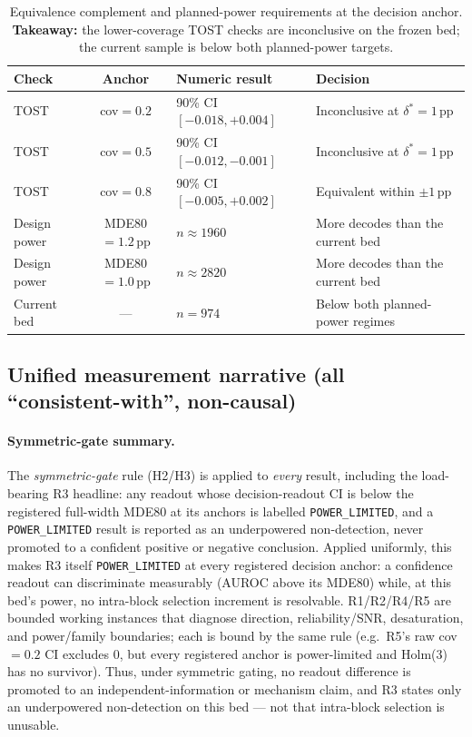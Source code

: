 \documentclass{article}
\begin{document}
\begin{table}[!htbp]
  \caption{Equivalence complement and planned-power requirements at the decision anchor.
  \textbf{Takeaway:} the lower-coverage TOST checks are inconclusive on the frozen bed;
  the current sample is below both planned-power targets.}
  \label{tab:powerplan}
  \centering
  \small
  \begin{tabularx}{\textwidth}{@{}lcl>{\raggedright\arraybackslash}X@{}}
    \toprule
    Check & Anchor & Numeric result & Decision \tabularnewline
    \midrule
    TOST & cov$=0.2$ & 90\% CI $[-0.018,+0.004]$ & Inconclusive at $\delta^*{=}1$\,pp \tabularnewline
    TOST & cov$=0.5$ & 90\% CI $[-0.012,-0.001]$ & Inconclusive at $\delta^*{=}1$\,pp \tabularnewline
    TOST & cov$=0.8$ & 90\% CI $[-0.005,+0.002]$ & Equivalent within $\pm1$\,pp \tabularnewline
    Design power & MDE80 $=1.2$\,pp & $n\approx1960$ & More decodes than the current bed \tabularnewline
    Design power & MDE80 $=1.0$\,pp & $n\approx2820$ & More decodes than the current bed \tabularnewline
    Current bed & --- & $n=974$ & Below both planned-power regimes \tabularnewline
    \bottomrule
  \end{tabularx}
\end{table}
\subsection{Unified measurement narrative (all ``consistent-with'', non-causal)}
\label{sec:method:narrative}

\paragraph{Symmetric-gate summary.}
The \emph{symmetric-gate} rule (H2/H3) is applied to \emph{every} result, including the
load-bearing R3 headline: any readout whose decision-readout CI is below the registered
full-width MDE80 at its anchors is labelled \texttt{POWER\_LIMITED}, and a
\texttt{POWER\_LIMITED} result is reported as an underpowered non-detection, never promoted
to a confident positive or negative conclusion. Applied uniformly, this makes R3 itself
\texttt{POWER\_LIMITED} at every registered decision anchor: a confidence readout can
discriminate measurably (AUROC above its MDE80) while, at this bed's power, no intra-block
selection increment is resolvable. R1/R2/R4/R5 are bounded working instances that diagnose
direction, reliability/SNR, desaturation, and power/family boundaries; each is bound by the
same rule (e.g.\ R5's raw cov$=0.2$ CI excludes 0, but every registered anchor is
power-limited and Holm(3) has no survivor). Thus, under symmetric gating, no readout
difference is promoted to an independent-information or mechanism claim, and R3 states only
an underpowered non-detection on this bed --- not that intra-block selection is unusable.
\end{document}
